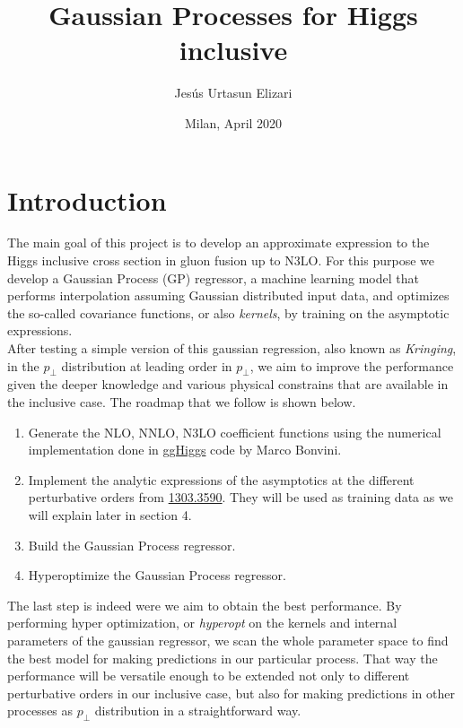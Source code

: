 \documentclass[12pt]{article}
\begin{document}
	
\title{Gaussian Processes for Higgs inclusive}
\author{Jes\'us Urtasun Elizari}
\date{Milan, April 2020}
\maketitle


\newpage
\section{Introduction}
The main goal of this project is to develop an approximate expression to the Higgs inclusive cross section in gluon fusion up to N3LO. For this purpose we develop a Gaussian Process (GP) regressor, a machine learning model that performs interpolation assuming Gaussian distributed input data, and optimizes the so-called covariance functions, or also \textit{kernels}, by training on the asymptotic expressions.\\

After testing a simple version of this gaussian regression, also known as \textit{Kringing}, in the $p_{\perp}$ distribution at leading order in $p_{\perp}$, we aim to improve the performance given the deeper knowledge and various physical constrains that are available in the inclusive case. The roadmap that we follow is shown below.\\

\begin{enumerate}
	\item Generate the NLO, NNLO, N3LO coefficient functions using the numerical implementation done in \href{https://www.ge.infn.it/~bonvini/higgs/}{ggHiggs} code by Marco Bonvini.
	\item Implement the analytic expressions of the asymptotics at the different perturbative orders from \href{https://arxiv.org/abs/1303.3590}{1303.3590}. They will be used as training data as we will explain later in section 4.
	\item Build the Gaussian Process regressor.
	\item Hyperoptimize the Gaussian Process regressor.
\end{enumerate}

The last step is indeed were we aim to obtain the best performance. By performing hyper optimization, or \textit{hyperopt} on the kernels and internal parameters of the gaussian regressor, we scan the whole parameter space to find the best model for making predictions in our particular process. That way the performance will be versatile enough to be extended not only to different perturbative orders in our inclusive case, but also for making predictions in other processes as $p_{\perp}$ distribution in a straightforward way.
\end{document}
